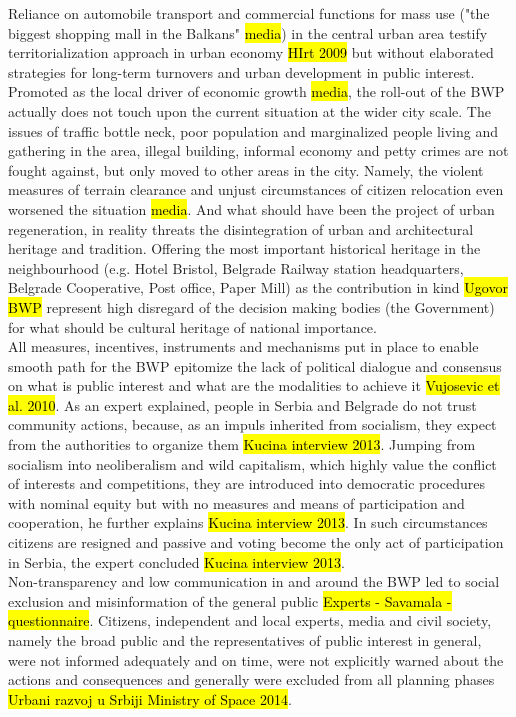 \documentclass[11pt]{report}
\begin{document}
Reliance on automobile transport and commercial functions for mass use ("the biggest shopping mall in the Balkans" \hl{media}) in the central urban area testify territorialization approach in urban economy \hl{HIrt 2009} but without elaborated strategies for long-term turnovers and urban development in public interest.
Promoted as the local driver of economic growth \hl{media}, the roll-out of the BWP actually does not touch upon the current situation at the wider city scale.
The issues of traffic bottle neck, poor population and marginalized people living and gathering in the area, illegal building, informal economy and petty crimes are not fought against, but only moved to other areas in the city. Namely, the violent measures of terrain clearance and unjust circumstances of citizen relocation even worsened the situation \hl{media}.
And what should have been the project of urban regeneration, in reality threats the disintegration of urban and architectural heritage and tradition. Offering the most important historical heritage in the neighbourhood (e.g. Hotel Bristol, Belgrade Railway station headquarters, Belgrade Cooperative, Post office, Paper Mill) as the contribution in kind \hl{Ugovor BWP} represent high disregard  of the decision making bodies (the Government) for what should be cultural heritage of national importance.
\\
All measures, incentives, instruments and mechanisms put in place to enable smooth path for the BWP epitomize the lack of political dialogue and consensus on what is public interest and what are the modalities to achieve it \hl{Vujosevic et al. 2010}. %
As an expert explained, people in Serbia and Belgrade do not trust community actions, because, as an impuls inherited from socialism, they expect from the authorities to organize them
\hl{Kucina interview 2013}.
Jumping from socialism into neoliberalism and wild capitalism, which highly value the conflict of interests and competitions, they are introduced into democratic procedures with nominal equity but with no measures and means of participation and cooperation, he further explains \hl{Kucina interview 2013}.
In such circumstances citizens are resigned and passive and voting become the only act of participation in Serbia, the expert concluded \hl{Kucina interview 2013}.
\\
Non-transparency and low communication in and around the BWP led to social exclusion and misinformation of the general public \hl{Experts - Savamala - questionnaire}.
Citizens, independent and local experts, media and civil society, namely the broad public and the representatives of public interest in general, were not informed adequately and on time, were not explicitly warned about the actions and consequences and generally were excluded from all planning phases \hl{Urbani razvoj u Srbiji Ministry of Space 2014}.
\end{document}

